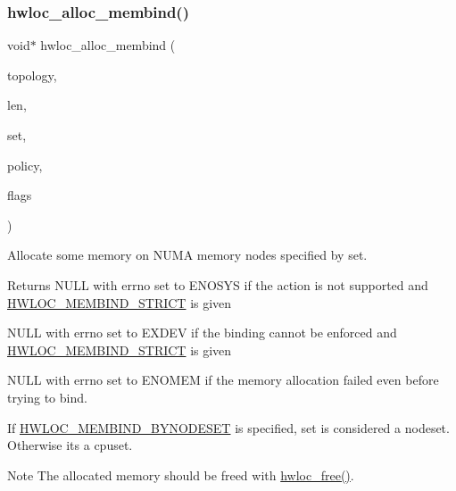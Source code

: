 \subsubsection{\texorpdfstring{hwloc\+\_\+alloc\+\_\+membind()}{hwloc\_alloc\_membind()}}
{\footnotesize\ttfamily void$\ast$ hwloc\+\_\+alloc\+\_\+membind (\begin{DoxyParamCaption}\item[{\hyperlink{a00186_ga9d1e76ee15a7dee158b786c30b6a6e38}{hwloc\+\_\+topology\+\_\+t}}]{topology,  }\item[{size\+\_\+t}]{len,  }\item[{\hyperlink{a00205_gae991a108af01d408be2776c5b2c467b2}{hwloc\+\_\+const\+\_\+bitmap\+\_\+t}}]{set,  }\item[{\hyperlink{a00191_gac9764f79505775d06407b40f5e4661e8}{hwloc\+\_\+membind\+\_\+policy\+\_\+t}}]{policy,  }\item[{int}]{flags }\end{DoxyParamCaption})}



Allocate some memory on N\+U\+MA memory nodes specified by {\ttfamily set}. 

\begin{DoxyReturn}{Returns}
N\+U\+LL with errno set to E\+N\+O\+S\+YS if the action is not supported and \hyperlink{a00191_ggab00475fd98815bf4fb9aaf752030e7d2a0335311a0ee04166df2888d52b4a42c6}{H\+W\+L\+O\+C\+\_\+\+M\+E\+M\+B\+I\+N\+D\+\_\+\+S\+T\+R\+I\+CT} is given 

N\+U\+LL with errno set to E\+X\+D\+EV if the binding cannot be enforced and \hyperlink{a00191_ggab00475fd98815bf4fb9aaf752030e7d2a0335311a0ee04166df2888d52b4a42c6}{H\+W\+L\+O\+C\+\_\+\+M\+E\+M\+B\+I\+N\+D\+\_\+\+S\+T\+R\+I\+CT} is given 

N\+U\+LL with errno set to E\+N\+O\+M\+EM if the memory allocation failed even before trying to bind.
\end{DoxyReturn}
If \hyperlink{a00191_ggab00475fd98815bf4fb9aaf752030e7d2a71f19fe4505f1c083dc8e6f7bdea6256}{H\+W\+L\+O\+C\+\_\+\+M\+E\+M\+B\+I\+N\+D\+\_\+\+B\+Y\+N\+O\+D\+E\+S\+ET} is specified, set is considered a nodeset. Otherwise it\textquotesingle{}s a cpuset.

\begin{DoxyNote}{Note}
The allocated memory should be freed with \hyperlink{a00191_ga32dbd4f54e9e4a7179f2dde37ffe6ad7}{hwloc\+\_\+free()}. 
\end{DoxyNote}
\mbox{\label{a00191_gab1b77b8408bacaf03c7e8878f7577922}} 
